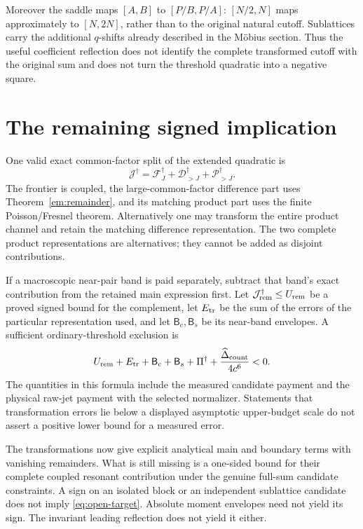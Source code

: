 \documentclass[11pt]{article}
\numberwithin{equation}{section}
\theoremstyle{definition}
\theoremstyle{remark}
\begin{document}
Moreover the saddle maps $[A,B]$ to $[P/B,P/A]$:
$[N/2,N]$ maps approximately to $[N,2N]$, rather than to the
original natural cutoff. Sublattices carry the additional $q$-shifts
already described in the M\"obius section. Thus the useful coefficient
reflection does not identify the complete transformed cutoff with the
original sum and does not turn the threshold quadratic into a negative
square.

\section{The remaining signed implication}
\label{sec:remaining}
One valid exact common-factor split of the extended quadratic is
\[
\mathcal J^\dagger
=\mathcal F_J^\dagger+\mathcal D_{>J}^\dagger
                         +\mathcal P_{>J}^\dagger .
\]
The frontier is coupled, the large-common-factor difference part uses
Theorem~\ref{em:remainder}, and its matching product part uses the finite
Poisson/Fresnel theorem. Alternatively one may transform the entire product
channel and retain the matching difference representation. The two
complete product representations are alternatives; they cannot be added
as disjoint contributions.

If a macroscopic near-pair band is paid separately, subtract that band's
exact contribution from the retained main expression first.
Let $\mathcal J^\dagger_{\rm rem}\le U_{\rm rem}$ be a proved signed
bound for the complement, let $E_{\rm tr}$ be the sum of the errors
of the particular representation used, and let $\mathsf B_c,\mathsf B_s$
be its near-band envelopes. A sufficient ordinary-threshold exclusion is
\begin{equation}
U_{\rm rem}+E_{\rm tr}+\mathsf B_c+\mathsf B_s+\Pi^\dagger
                  +\frac{\widehat\Delta_{\rm count}}{4c^6}<0.
\label{eq:open-target}
\end{equation}
The quantities in this formula include the measured candidate payment
and the physical raw-jet payment with the selected normalizer. Statements
that transformation errors lie below a displayed asymptotic upper-budget
scale do not assert a positive lower bound for a measured error.

The transformations now give explicit analytical main and boundary terms
with vanishing remainders. What is still missing is a one-sided bound for
their complete coupled resonant contribution under the genuine full-sum
candidate constraints. A sign on an isolated block or an independent
sublattice candidate does not imply \eqref{eq:open-target}. Absolute
moment envelopes need not yield its sign. The invariant leading reflection
does not yield it either.
\end{document}
